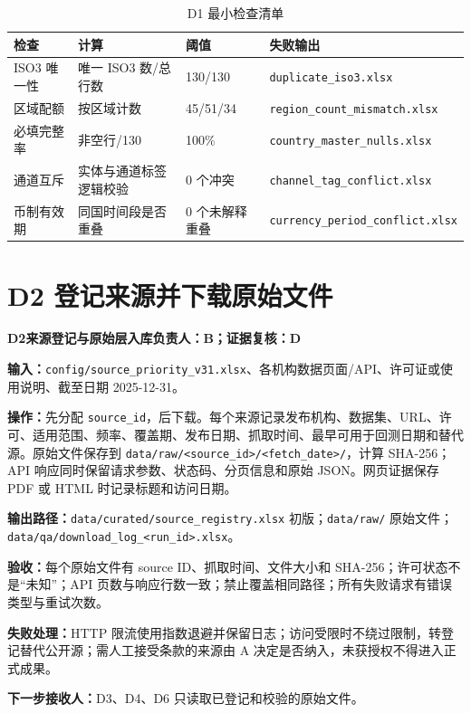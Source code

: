 \documentclass[UTF8,fontset=windows,12pt,openany]{ctexbook}
\newcommand{\Field}[1]{{\small\nolinkurl{#1}}}
\newcommand{\File}[1]{{\small\nolinkurl{#1}}}
\newcommand{\StepTitle}[3]{%
  \noindent\colorbox{DeepNavy}{\parbox{0.965\textwidth}{\color{white}\Large\bfseries #1\quad #2\hfill\normalsize #3}}\par\medskip
}
\newcommand{\CardRow}[2]{\noindent\textbf{#1：}#2\par}
\begin{document}
\begin{longtable}{p{3.2cm}p{3.1cm}p{3.0cm}p{4.0cm}}
\caption{D1 最小检查清单}\label{tab:d1-check}\\
\toprule
\textbf{检查} & \textbf{计算} & \textbf{阈值} & \textbf{失败输出}\\
\midrule
ISO3 唯一性 & 唯一 ISO3 数/总行数 & 130/130 & \File{duplicate_iso3.xlsx}\\
区域配额 & 按区域计数 & 45/51/34 & \File{region_count_mismatch.xlsx}\\
必填完整率 & 非空行/130 & 100\% & \File{country_master_nulls.xlsx}\\
通道互斥 & 实体与通道标签逻辑校验 & 0 个冲突 & \File{channel_tag_conflict.xlsx}\\
币制有效期 & 同国时间段是否重叠 & 0 个未解释重叠 & \File{currency_period_conflict.xlsx}\\
\bottomrule
\end{longtable}

\newpage
\section{D2 登记来源并下载原始文件}
\StepTitle{D2}{来源登记与原始层入库}{负责人：B；证据复核：D}
\CardRow{输入}{\File{config/source_priority_v31.xlsx}、各机构数据页面/API、许可证或使用说明、截至日期 2025-12-31。}
\CardRow{操作}{先分配 \Field{source_id}，后下载。每个来源记录发布机构、数据集、URL、许可、适用范围、频率、覆盖期、发布日期、抓取时间、最早可用于回测日期和替代源。原始文件保存到 \File{data/raw/<source_id>/<fetch_date>/}，计算 SHA-256；API 响应同时保留请求参数、状态码、分页信息和原始 JSON。网页证据保存 PDF 或 HTML 时记录标题和访问日期。}
\CardRow{输出路径}{\File{data/curated/source_registry.xlsx} 初版；\File{data/raw/} 原始文件；\File{data/qa/download_log_<run_id>.xlsx}。}
\CardRow{验收}{每个原始文件有 source ID、抓取时间、文件大小和 SHA-256；许可状态不是“未知”；API 页数与响应行数一致；禁止覆盖相同路径；所有失败请求有错误类型与重试次数。}
\CardRow{失败处理}{HTTP 限流使用指数退避并保留日志；访问受限时不绕过限制，转登记替代公开源；需人工接受条款的来源由 A 决定是否纳入，未获授权不得进入正式成果。}
\CardRow{下一步接收人}{D3、D4、D6 只读取已登记和校验的原始文件。}
\end{document}

